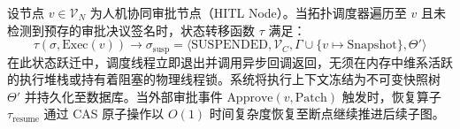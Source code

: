 \begin{lemma}[非阻塞定界挂起定理]
    \label{lem:delimited_continuation}
    设节点 $v \in \mathcal{V}_N$ 为人机协同审批节点（HITL Node）。当拓扑调度器遍历至 $v$ 且未检测到预存的审批决议签名时，状态转移函数 $\tau$ 满足：
    \begin{equation}
        \tau(\sigma, \text{Exec}(v)) \rightarrow \sigma_{\text{susp}} = \langle \text{SUSPENDED}, \mathcal{V}_C, \Gamma \cup \{v \mapsto \text{Snapshot}\}, \Theta' \rangle
    \end{equation}
    在此状态跃迁中，调度线程立即退出并调用异步回调返回，无须在内存中维系活跃的执行堆栈或持有着阻塞的物理线程锁。系统将执行上下文冻结为不可变快照树 $\Theta'$ 并持久化至数据库。当外部审批事件 $\text{Approve}(v, \text{Patch})$ 触发时，恢复算子 $\tau_{\text{resume}}$ 通过 CAS 原子操作以 $O(1)$ 时间复杂度恢复至断点继续推进后续子图。
\end{lemma}
